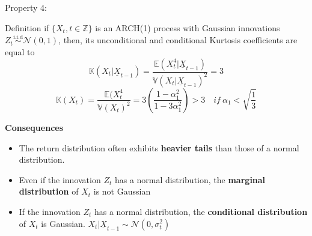 \documentclass{beamer}
\def\Z{\mathbb{Z}}
\def\Esp{\mathbb{E}}
\def\Var{\mathbb{V}}
\def\Kurt{\mathbb{K}}
\def\N{\mathcal{N}}
\newcommand{\imfbold}[1]{\textbf{\textcolor{imfblue}{#1}}}
\begin{document}
\begin{frame}{Property 4:}
\small
    \begin{block}{Definition}
        if $\{ X_t, t\in \Z\}$ is an ARCH(1) process with Gaussian innovations $Z_t \overset{\mathrm{i.i.d}}{\sim} \N(0,1)$, then, its unconditional and conditional Kurtosis coefficients are equal to
        $$\Kurt(X_t|\underline{X}_{t-1}) = \frac{\Esp(X_t^4|\underline{X}_{t-1})}{{\Var(X_t|\underline{X}_{t-1})}^2} =3 $$
        $$\Kurt(X_t) = \frac{\Esp(X_t^4}{\Var(X_t)^2} = 3 \left( \frac{1-\alpha_1^2}{1-3\alpha_1^2} \right) > 3 \quad if ~\alpha_1<\sqrt{\frac{1}{3}}$$
    \end{block}
    \imfbold{Consequences}
    \begin{itemize}
        \item The return distribution often exhibits \textbf{\color{red}heavier tails} than those of a normal distribution.
        \item Even if the innovation $Z_t$ has a normal distribution, the \textbf{\color{red}marginal distribution} of $X_t$ is not Gaussian
        \item If the innovation $Z_t$ has a normal distribution, the \textbf{\color{red}conditional distribution} of $X_t$ is Gaussian. $X_t|\underline{X}_{t-1} \sim \N(0, \sigma_t^2)$
    \end{itemize}
\end{frame}
\end{document}
